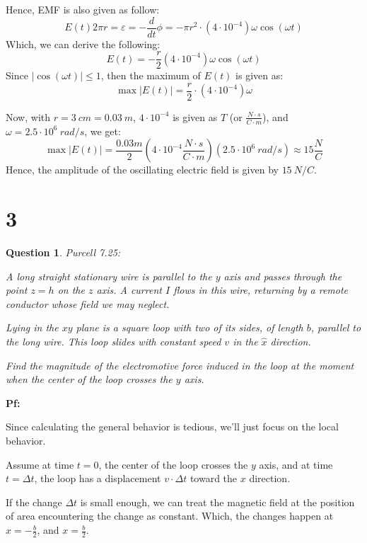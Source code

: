 \documentclass{article}
\newtheorem{question}{Question}
\begin{document}
Hence, EMF is also given as follow:
$$E(t)2\pi r=\varepsilon=-\frac{d}{dt}\phi = -\pi r^2\cdot (4\cdot 10^{-4})\omega \cos(\omega t)$$
Which, we can derive the following:
$$E(t)=-\frac{r}{2}(4\cdot 10^{-4})\omega \cos(\omega t)$$
Since $|\cos(\omega t)|\leq 1$, then the maximum of $E(t)$ is given as:
$$\max|E(t)|=\frac{r}{2}\cdot (4\cdot 10^{-4})\omega$$

\hfill

Now, with $r=3\ cm=0.03\ m$, $4\cdot 10^{-4}$ is given as $T$ (or $\frac{N\cdot s}{C\cdot m}$), and $\omega = 2.5\cdot 10^6\ rad/s$, we get:
$$\max|E(t)|=\frac{0.03 m}{2}\left(4\cdot 10^{-4} \frac{N\cdot s}{C\cdot m}\right)(2.5\cdot 10^6\ rad/s)\approx 15 \frac{N}{C}$$
Hence, the amplitude of the oscillating electric field is given by $15\ N/C$.

\break

\section*{3}
\begin{myBox}[]{}
    \begin{question}
        Purcell 7.25:

        A long straight stationary wire is parallel to the $y$ axis and passes
        through the point $z = h$ on the $z$ axis. A current $I$ flows in this
        wire, returning by a remote conductor whose field we may neglect.

        Lying in the $xy$ plane is a square loop with two of its sides, of
        length $b$, parallel to the long wire. This loop slides with constant
        speed $v$ in the $\hat{x}$ direction. 
        
        Find the magnitude of the electromotive
        force induced in the loop at the moment when the center of the
        loop crosses the $y$ axis.
    \end{question}
\end{myBox}

\textbf{Pf:}

Since calculating the general behavior is tedious, we'll just focus on the local behavior.

Assume at time $t=0$, the center of the loop crosses the $y$ axis, and at time $t=\Delta t$, the loop has a displacement $v\cdot \Delta t$ toward the $x$ direction.

If the change $\Delta t$ is small enough, we can treat the magnetic field at the position of area encountering the change as constant.
Which, the changes happen at $x=-\frac{b}{2}$, and $x=\frac{b}{2}$.
\end{document}
